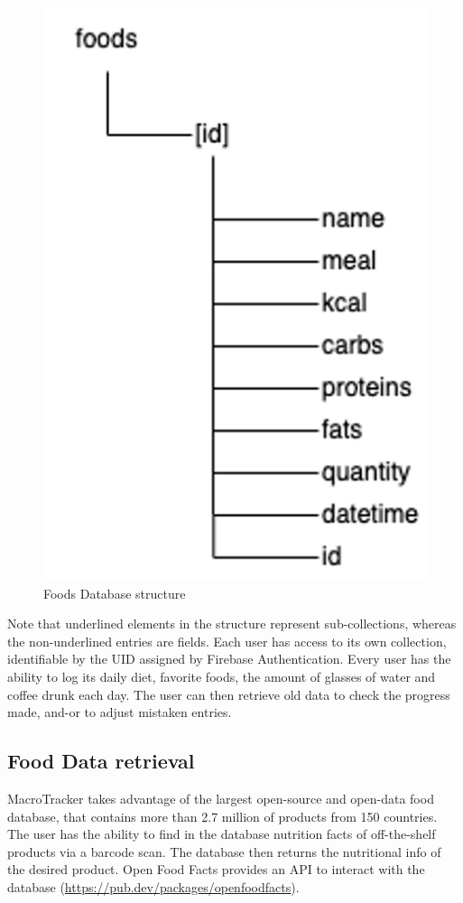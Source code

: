 \documentclass{Configuration_Files/PoliMi3i_thesis}
\begin{document}
\begin{figure}[H]
  \centering
  \includegraphics[scale=0.6]{Images/foods_db.png}
  \caption{Foods Database structure}
\end{figure}
Note that underlined elements in the structure represent sub-collections, whereas the non-underlined entries are fields. 
Each user has access to its own collection, identifiable by the UID assigned by Firebase Authentication. 
Every user has the ability to log its daily diet, favorite foods, the amount of glasses of water and coffee drunk each day. The user can then retrieve old data to check the progress made, and-or to adjust mistaken entries. 
\subsection{Food Data retrieval}
MacroTracker takes advantage of the largest open-source and open-data food database, that contains more than 2.7 million of products from 150 countries. 
The user has the ability to find in the database nutrition facts of off-the-shelf products via a barcode scan. The database then returns the nutritional info of the desired product. 
Open Food Facts provides an API to interact with the database (\url{https://pub.dev/packages/openfoodfacts}).
\end{document}
